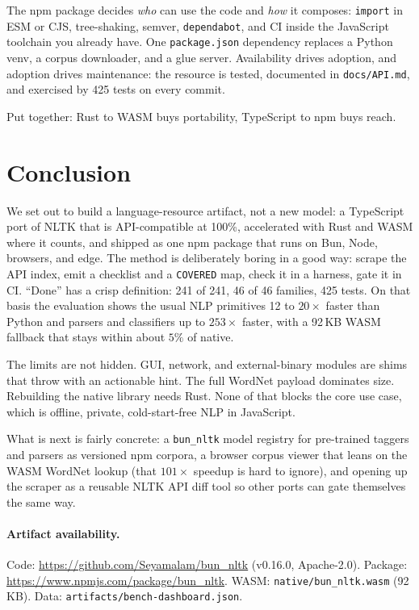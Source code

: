 \documentclass[smallextended]{svjour3}
\begin{document}
The npm package decides \emph{who} can use the code and \emph{how} it composes: \texttt{import} in ESM or CJS, tree-shaking, semver, \texttt{dependabot}, and CI inside the JavaScript toolchain you already have. One \texttt{package.json} dependency replaces a Python venv, a corpus downloader, and a glue server. Availability drives adoption, and adoption drives maintenance: the resource is tested, documented in \texttt{docs/API.md}, and exercised by 425 tests on every commit.

Put together: Rust to WASM buys portability, TypeScript to npm buys reach.

\section{Conclusion}
\label{sec:conclusion}

We set out to build a language-resource artifact, not a new model: a TypeScript port of NLTK that is API-compatible at 100\%, accelerated with Rust and WASM where it counts, and shipped as one npm package that runs on Bun, Node, browsers, and edge. The method is deliberately boring in a good way: scrape the API index, emit a checklist and a \texttt{COVERED} map, check it in a harness, gate it in CI. ``Done'' has a crisp definition: 241 of 241, 46 of 46 families, 425 tests. On that basis the evaluation shows the usual NLP primitives 12 to $20\times$ faster than Python and parsers and classifiers up to $253\times$ faster, with a 92\,KB WASM fallback that stays within about $5\%$ of native.

The limits are not hidden. GUI, network, and external-binary modules are shims that throw with an actionable hint. The full WordNet payload dominates size. Rebuilding the native library needs Rust. None of that blocks the core use case, which is offline, private, cold-start-free NLP in JavaScript.

What is next is fairly concrete: a \texttt{bun\_nltk} model registry for pre-trained taggers and parsers as versioned npm corpora, a browser corpus viewer that leans on the WASM WordNet lookup (that $101\times$ speedup is hard to ignore), and opening up the scraper as a reusable NLTK API diff tool so other ports can gate themselves the same way.

\paragraph{Artifact availability.}
Code: \url{https://github.com/Seyamalam/bun_nltk} (v0.16.0, Apache-2.0). Package: \url{https://www.npmjs.com/package/bun_nltk}. WASM: \texttt{native/bun\_nltk.wasm} (92\,KB). Data: \texttt{artifacts/bench-dashboard.json}.
\end{document}
